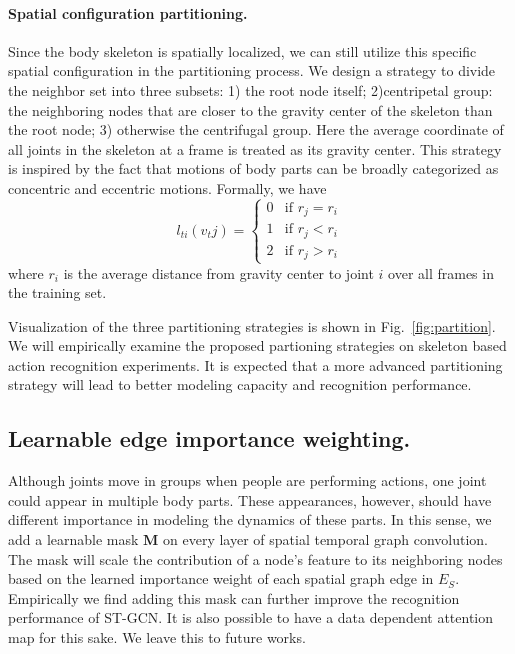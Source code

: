 \documentclass[letterpaper]{article} %
\begin{document}
\paragraph{Spatial configuration partitioning.}
Since the body skeleton is spatially localized, we can still utilize this specific spatial configuration in the partitioning process.
We design a strategy to divide the neighbor set into three subsets:
1) the root node itself; 2)centripetal group: the neighboring nodes that are closer to the gravity center of the skeleton than the root node; 3) otherwise the centrifugal group.
Here the average coordinate of all joints in the skeleton at a frame is treated as its gravity center.
This strategy is inspired by the fact that motions of body parts can be broadly categorized as concentric and eccentric motions. Formally, we have 
\begin{equation}
l_{ti}({v_tj})=
	\begin{cases}
	   0 &\mbox{if $r_{j} = r_{i}$}\\
	   1 &\mbox{if $r_{j} < r_{i}$}\\
	   2 &\mbox{if $r_{j} > r_{i}$}
	\end{cases}
\end{equation}
where $r_i$ is the average distance from gravity center to joint $i$ over all frames in the training set.
 
Visualization of the three partitioning strategies is shown in Fig.~\ref{fig:partition}. We will empirically examine the proposed partioning strategies on skeleton based action recognition experiments. 
It is expected that a more advanced partitioning strategy will lead to better modeling capacity and recognition performance.



\subsection{Learnable edge importance weighting.}
Although joints move in groups when people are performing actions, one joint could appear in multiple body parts. These appearances, however, should have different importance in modeling the dynamics of these parts. 
In this sense, we add a learnable mask $ \mathbf{M} $ on every layer of spatial temporal graph convolution. 
The mask will scale the contribution of a node's feature to its neighboring nodes based on the learned importance weight of each spatial graph edge in $ E_S $.
Empirically we find adding this mask can further improve the recognition performance of ST-GCN.
It is also possible to have a data dependent attention map for this sake. We leave this to future works.
\end{document}
